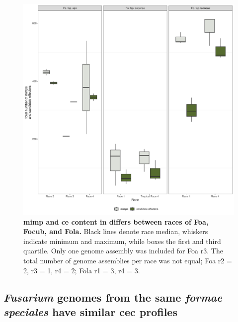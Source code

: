 \begin{figure}[hp!]
    \centering
    \includegraphics[width=\textwidth]{Figures/MimpsAndCandEffs_FspOfInterest.png}
    \caption[Boxplot of \ac{ce} and \ac{mimp} content in difference races of \ac{Foa}, \ac{Focub}, and \ac{Fola}.]{\textbf{\Acf{mimp} and \acf{ce} content in differs between races of \ac{Foa}, \ac{Focub}, and \ac{Fola}.} Black lines denote race median, whiskers indicate minimum and maximum, while boxes the first and third quartile. Only one genome assembly was included for \ac{Foa} \ac{r3}. The total number of genome assemblies per race was not equal; \ac{Foa} \ac{r2} = 2, \ac{r3} = 1, \ac{r4} = 2; \ac{Fola} \ac{r1} = 3, \ac{r4} = 3.}
    \label{fig:MaeiBoxPlot}
\end{figure}

\subsection{\textit{Fusarium} genomes from the same \textit{formae speciales} have similar \acl{cec} profiles}

